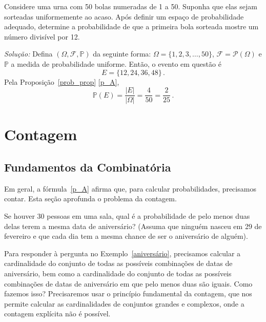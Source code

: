 \begin{exercise}
Considere uma urna com 50 bolas numeradas de 1 a 50. Suponha que elas sejam sorteadas uniformemente ao acaso. Após definir um espaço de probabilidade adequado, determine a probabilidade de que a primeira bola sorteada mostre um número divisível por 12.
\end{exercise}

\noindent \emph{Solução:} Defina $(\Omega,\mathcal{F},\mathbb{P})$ da seguinte forma: $\Omega=\{1,2,3,\dots,50\}$, $\mathcal{F} = \mathcal{P}(\Omega)$ e $\mathbb{P}$ a medida de probabilidade uniforme. Então, o evento em questão é
\begin{equation}
E = \{12,24,36,48\} \,.
\end{equation}
Pela Proposição~\ref{prob_prop} \eqref{p_A},
\begin{equation}
\mathbb{P}(E) = \frac{|E|}{|\Omega|} = \frac{4}{50} = \frac{2}{25} \,.
\end{equation}

\cleardoublepage
\section{Contagem}
\label{sec: how to count}

\subsection{Fundamentos da Combinatória}

Em geral, a fórmula~\eqref{p_A} afirma que, para calcular probabilidades, precisamos contar. Esta seção aprofunda o problema da contagem.

\begin{example}
\label{aniversário}
Se houver 30 pessoas em uma sala, qual é a probabilidade de pelo menos duas delas terem a mesma data de aniversário? (Assuma que ninguém nasceu em 29 de fevereiro e que cada dia tem a mesma chance de ser o aniversário de alguém).
\end{example}

Para responder à pergunta no Exemplo~\ref{aniversário}, precisamos calcular a cardinalidade do conjunto de todas as possíveis combinações de datas de aniversário, bem como a cardinalidade do conjunto de todas as possíveis combinações de datas de aniversário em que pelo menos duas são iguais. Como fazemos isso? Precisaremos usar o princípio fundamental da contagem, que nos permite calcular as cardinalidades de conjuntos grandes e complexos, onde a contagem explícita não é possível.

